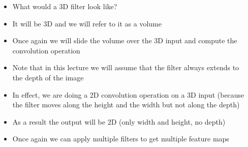 \begin{frame}
	\begin{columns}
		
		\begin{overlayarea}{\textwidth}{\textheight}
			
		\end{overlayarea}
		
		\begin{overlayarea}{\textwidth}{\textheight}
			\justifying
			\begin{itemize}
				\justifying
				\item<1-> What would a 3D filter look like?
				\item<2-> It will be 3D and we will refer to it as a volume
				\item<3-> Once again we will slide the volume over the 3D input and compute the convolution operation
				\item<15-> Note that in this lecture we will assume that the filter always extends to the depth of the image
				\item<16-> In effect, we are doing a 2D convolution operation on a 3D input (because the filter moves along the height and the width but not along the depth)
				\item<17-> As a result the output will be 2D (only width and height, no depth)
				\item<18-> Once again we can apply multiple filters to get multiple feature maps
			\end{itemize}
		\end{overlayarea}
	\end{columns}
\end{frame}
